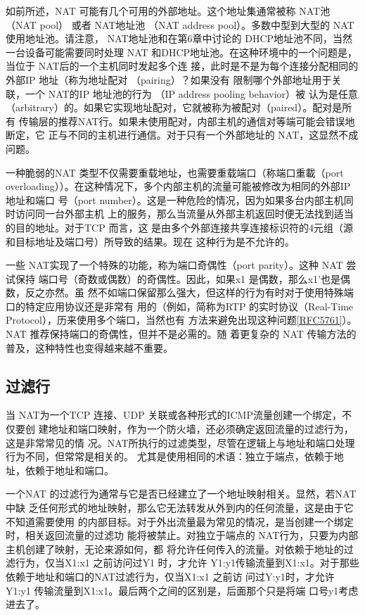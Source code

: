如前所述，NAT 可能有几个可用的外部地址。这个地址集通常被称 NAT池（NAT
pool） 或者 NAT地址池 （NAT address pool）。多数中型到大型的 NAT 使用地址池。请注意，
NAT地址池和在第6章中讨论的 DHCP地址池不同，当然一台设备可能需要同时处理 NAT
和DHCP地址池。在这种环境中的一个问题是，当位于 NAT后的一个主机同时发起多个连
接，此时是不是为每个连接分配相同的外部IP 地址（称为地址配对 （pairing）？如果没有
限制哪个外部地址用于关联，一个 NAT的IP 地址池的行为 （IP address pooling behavior）被
认为是任意（arbitrary）的。如果它实现地址配对，它就被称为被配对（paired）。配对是所有
传输层的推荐NAT行。如果未使用配对，内部主机的通信对等端可能会错误地断定，它
正与不同的主机进行通信。对于只有一个外部地址的 NAT，这显然不成问题。

一种脆弱的NAT 类型不仅需要重载地址，也需要重载端口（称端口重載（port
overloading））。在这种情况下，多个内部主机的流量可能被修改为相同的外部IP地址和端口
号（port number）。这是一种危险的情况，因为如果多台内部主机同时访问同一台外部主机
上的服务，那么当流量从外部主机返回时便无法找到适当的目的地址。对于TCP 而言，这
是由多个外部连接共享连接标识符的4元组（源和目标地址及端口号）所导致的结果。现在
这种行为是不允许的。

一些 NAT实现了一个特殊的功能，称为端口奇偶性（port parity）。这种 NAT 尝试保持
端口号（奇数或偶数）的奇偶性。因此，如果x1 是偶数，那么x1'也是偶数，反之亦然。虽
然不如端口保留那么强大，但这样的行为有时对于使用特殊端口的特定应用协议还是非常有
用的（例如，简称为RTP 的实时协议（Real-Time Protocol），历来使用多个端口，当然也有
方法来避免出现这种问题\href{https://www.rfc-editor.org/rfc/rfc5761}{[RFC5761]}）。NAT 推荐保持端口的奇偶性，但并不是必需的。随
着更复杂的 NAT 传输方法的普及，这种特性也变得越来越不重要。

\subsection{过滤行}

当 NAT为一个TCP 连接、UDP 关联或各种形式的ICMP流量创建一个绑定，不仅要创
建地址和端口映射，作为一个防火墙，还必须确定返回流量的过滤行为，这是非常常见的情
况。NAT所执行的过滤类型，尽管在逻辑上与地址和端口处理行为不同，但常常是相关的。
尤其是使用相同的术语：独立于端点，依赖于地址，依赖于地址和端口。

一个NAT 的过滤行为通常与它是否已经建立了一个地址映射相关。显然，若NAT 中缺
乏任何形式的地址映射，那么它无法转发从外到内的任何流量，这是由于它不知道需要使用
的内部目标。对于外出流量最为常见的情况，是当创建一个绑定时，相关返回流量的过滤功
能将被禁止。对独立于端点的 NAT行为，只要为内部主机创建了映射，无论来源如何，都
将允许任何传入的流量。对依赖于地址的过滤行为，仅当X1:x1 之前访问过Y1 时，才允许
Y1:y1传输流量到X1:x1。对于那些依赖于地址和端口的NAT过滤行为，仅当X1:x1 之前访
问过Y:y1时，才允许 Y1:y1 传输流量到X1:x1。最后两个之间的区别是，后面那个只是将端
口号y1考虑进去了。

